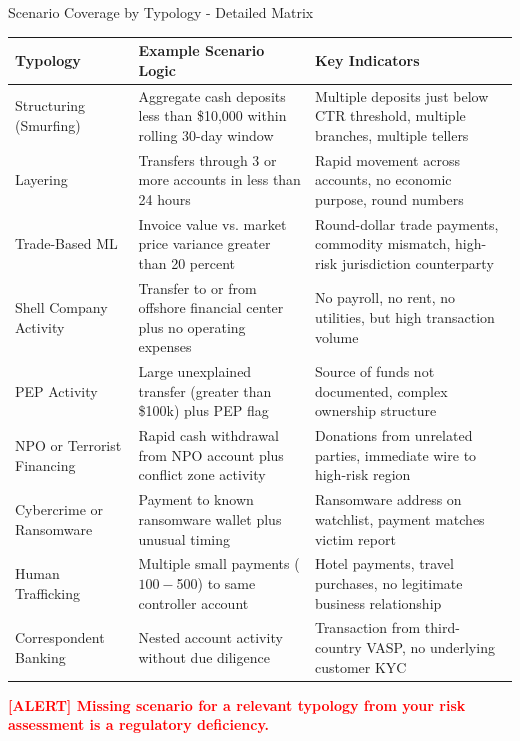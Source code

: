 \documentclass[11pt,a4paper]{beamer}
\newcommand{\redflag}[1]{\textcolor{red}{\textbf{[ALERT] #1}}}
\begin{document}
	\begin{frame}{Scenario Coverage by Typology - Detailed Matrix}
		\begin{longtable}{p{}|p{}|p{}}
			\hline
			\rowcolor{lightgray}
			\textbf{Typology} & \textbf{Example Scenario Logic} & \textbf{Key Indicators} \\
			\hline
			Structuring (Smurfing) & Aggregate cash deposits less than \$10,000 within rolling 30-day window & Multiple deposits just below CTR threshold, multiple branches, multiple tellers \\
			\hline
			Layering & Transfers through 3 or more accounts in less than 24 hours & Rapid movement across accounts, no economic purpose, round numbers \\
			\hline
			Trade-Based ML & Invoice value vs. market price variance greater than 20 percent & Round-dollar trade payments, commodity mismatch, high-risk jurisdiction counterparty \\
			\hline
			Shell Company Activity & Transfer to or from offshore financial center plus no operating expenses & No payroll, no rent, no utilities, but high transaction volume \\
			\hline
			PEP Activity & Large unexplained transfer (greater than \$100k) plus PEP flag & Source of funds not documented, complex ownership structure \\
			\hline
			NPO or Terrorist Financing & Rapid cash withdrawal from NPO account plus conflict zone activity & Donations from unrelated parties, immediate wire to high-risk region \\
			\hline
			Cybercrime or Ransomware & Payment to known ransomware wallet plus unusual timing & Ransomware address on watchlist, payment matches victim report \\
			\hline
			Human Trafficking & Multiple small payments ($100-$500) to same controller account & Hotel payments, travel purchases, no legitimate business relationship \\
			\hline
			Correspondent Banking & Nested account activity without due diligence & Transaction from third-country VASP, no underlying customer KYC \\
			\hline
		\end{longtable}
		
		\redflag{Missing scenario for a relevant typology from your risk assessment is a regulatory deficiency.}
	\end{frame}
	
\end{document}
